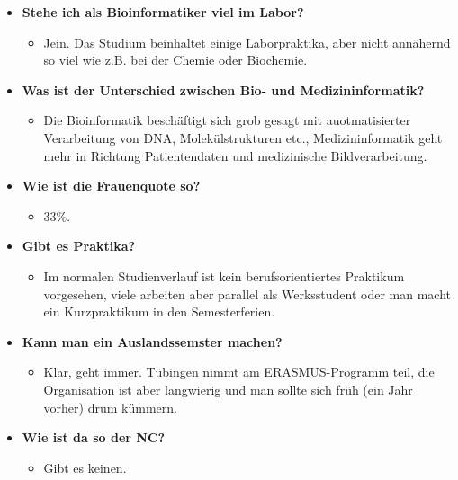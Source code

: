 \begin{large}
		\begin{itemize}
			\item \textbf{Stehe ich als Bioinformatiker viel im Labor?}
			\begin{itemize}
				\item Jein. Das Studium beinhaltet einige Laborpraktika, aber nicht annähernd so viel wie z.B. bei der Chemie oder Biochemie.
			\end{itemize}
		\end{itemize}
	
	\begin{itemize}
		\item \textbf{Was ist der Unterschied zwischen Bio- und Medizininformatik?}
		\begin{itemize}
			\item Die Bioinformatik beschäftigt sich grob gesagt mit auotmatisierter Verarbeitung von DNA, Molekülstrukturen etc., Medizininformatik geht mehr in Richtung Patientendaten und medizinische Bildverarbeitung.
		\end{itemize}
	\end{itemize}

\begin{itemize}
	\item \textbf{Wie ist die Frauenquote so?}
	\begin{itemize}
		\item 33\%.
	\end{itemize}
\end{itemize}

\begin{itemize}
	\item \textbf{Gibt es Praktika?}
	\begin{itemize}
		\item Im normalen Studienverlauf ist kein berufsorientiertes Praktikum vorgesehen, viele arbeiten aber parallel als Werksstudent oder man macht ein Kurzpraktikum in den Semesterferien.
	\end{itemize}
\end{itemize}

\begin{itemize}
	\item \textbf{Kann man ein Auslandssemster machen?}
	\begin{itemize}
		\item  Klar, geht immer. Tübingen nimmt am ERASMUS-Programm teil, die Organisation ist aber langwierig und man sollte sich früh (ein Jahr vorher) drum kümmern.
	\end{itemize}
\end{itemize}

\begin{itemize}
	\item \textbf{Wie ist da so der NC?}
	\begin{itemize}
		\item Gibt es keinen.
	\end{itemize}
\end{itemize}

	\end{large}
